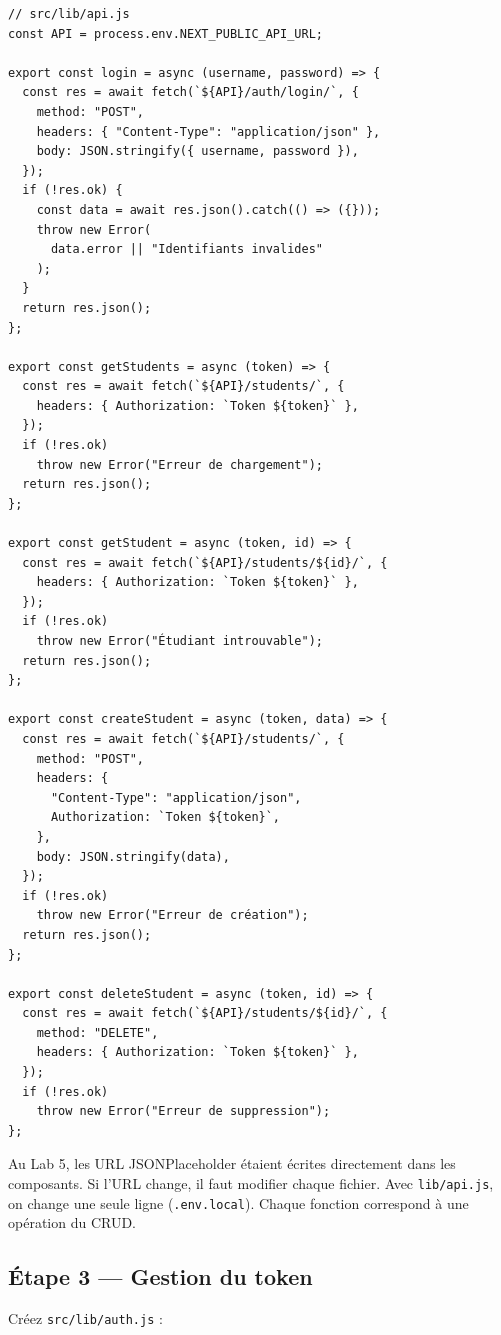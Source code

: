 \documentclass[11pt,a4paper]{article}
\begin{document}
\begin{lstlisting}
// src/lib/api.js
const API = process.env.NEXT_PUBLIC_API_URL;

export const login = async (username, password) => {
  const res = await fetch(`${API}/auth/login/`, {
    method: "POST",
    headers: { "Content-Type": "application/json" },
    body: JSON.stringify({ username, password }),
  });
  if (!res.ok) {
    const data = await res.json().catch(() => ({}));
    throw new Error(
      data.error || "Identifiants invalides"
    );
  }
  return res.json();
};

export const getStudents = async (token) => {
  const res = await fetch(`${API}/students/`, {
    headers: { Authorization: `Token ${token}` },
  });
  if (!res.ok)
    throw new Error("Erreur de chargement");
  return res.json();
};

export const getStudent = async (token, id) => {
  const res = await fetch(`${API}/students/${id}/`, {
    headers: { Authorization: `Token ${token}` },
  });
  if (!res.ok)
    throw new Error("Étudiant introuvable");
  return res.json();
};

export const createStudent = async (token, data) => {
  const res = await fetch(`${API}/students/`, {
    method: "POST",
    headers: {
      "Content-Type": "application/json",
      Authorization: `Token ${token}`,
    },
    body: JSON.stringify(data),
  });
  if (!res.ok)
    throw new Error("Erreur de création");
  return res.json();
};

export const deleteStudent = async (token, id) => {
  const res = await fetch(`${API}/students/${id}/`, {
    method: "DELETE",
    headers: { Authorization: `Token ${token}` },
  });
  if (!res.ok)
    throw new Error("Erreur de suppression");
};
\end{lstlisting}

\begin{infobox}
Au Lab 5, les URL JSONPlaceholder étaient écrites directement dans les composants. Si l'URL change, il faut modifier chaque fichier. Avec \texttt{lib/api.js}, on change une seule ligne (\texttt{.env.local}). Chaque fonction correspond à une opération du CRUD.
\end{infobox}

\subsection{Étape 3 --- Gestion du token}

Créez \texttt{src/lib/auth.js} :
\end{document}
